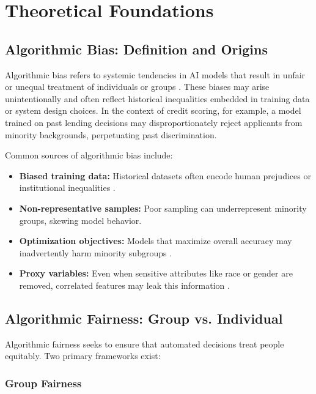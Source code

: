 \section{Theoretical Foundations}

\subsection{Algorithmic Bias: Definition and Origins}

Algorithmic bias refers to systemic tendencies in AI models that result in unfair or unequal treatment of individuals or groups \cite{barocas2016big,mehrabi2021survey}. These biases may arise unintentionally and often reflect historical inequalities embedded in training data or system design choices. In the context of credit scoring, for example, a model trained on past lending decisions may disproportionately reject applicants from minority backgrounds, perpetuating past discrimination.

Common sources of algorithmic bias include:

\begin{itemize}
    \item \textbf{Biased training data:} Historical datasets often encode human prejudices or institutional inequalities \cite{barocas2016big}.
    \item \textbf{Non-representative samples:} Poor sampling can underrepresent minority groups, skewing model behavior.
    \item \textbf{Optimization objectives:} Models that maximize overall accuracy may inadvertently harm minority subgroups \cite{mehrabi2021survey}.
    \item \textbf{Proxy variables:} Even when sensitive attributes like race or gender are removed, correlated features may leak this information \cite{bellamy2019aif360}.
\end{itemize}

\subsection{Algorithmic Fairness: Group vs. Individual}

Algorithmic fairness seeks to ensure that automated decisions treat people equitably. Two primary frameworks exist:

\subsubsection{Group Fairness}

